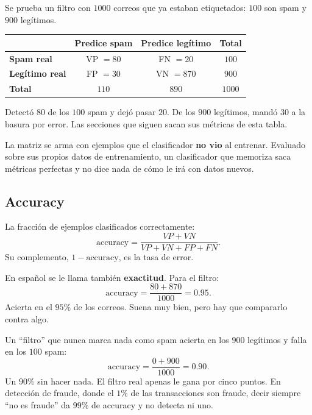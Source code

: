 \documentclass[11pt,letterpaper]{article}
\begin{document}
\begin{ejemplo}
    Se prueba un filtro con $1000$ correos que ya estaban etiquetados:
    $100$ son spam y $900$ legítimos.
    \begin{center}
    \begin{tabular}{lccc}
        \toprule
        & \textbf{Predice spam} & \textbf{Predice legítimo}
        & \textbf{Total} \\
        \midrule
        \textbf{Spam real}      & VP $= 80$ & FN $= 20$  & $100$ \\
        \textbf{Legítimo real}  & FP $= 30$ & VN $= 870$ & $900$ \\
        \midrule
        \textbf{Total} & $110$ & $890$ & $1000$ \\
        \bottomrule
    \end{tabular}
    \end{center}
    Detectó $80$ de los $100$ spam y dejó pasar $20$. De los $900$
    legítimos, mandó $30$ a la basura por error. Las secciones que
    siguen sacan sus métricas de esta tabla.
\end{ejemplo}

\begin{ojo}
    La matriz se arma con ejemplos que el clasificador \textbf{no vio}
    al entrenar. Evaluado sobre sus propios datos de entrenamiento,
    un clasificador que memoriza saca métricas perfectas y no dice
    nada de cómo le irá con datos nuevos.
\end{ojo}


\subsection*{Accuracy}

\begin{definicion}[Accuracy]
    La fracción de ejemplos clasificados correctamente:
    \[
        \text{accuracy} = \frac{VP + VN}{VP + VN + FP + FN} .
    \]
    Su complemento, $1 - \text{accuracy}$, es la tasa de error.
\end{definicion}

En español se le llama también \textbf{exactitud}. Para el filtro:
\[
    \text{accuracy} = \frac{80 + 870}{1000} = 0.95 .
\]
Acierta en el $95\%$ de los correos. Suena muy bien, pero hay que
compararlo contra algo.

\begin{ejemplo}
    Un ``filtro'' que nunca marca nada como spam acierta en los $900$
    legítimos y falla en los $100$ spam:
    \[
        \text{accuracy} = \frac{0 + 900}{1000} = 0.90 .
    \]
    Un $90\%$ sin hacer nada. El filtro real apenas le gana por cinco
    puntos. En detección de fraude, donde el $1\%$ de las transacciones
    son fraude, decir siempre ``no es fraude'' da $99\%$ de accuracy y
    no detecta ni uno.
\end{ejemplo}
\end{document}
